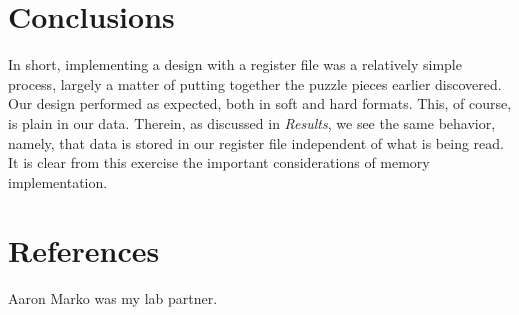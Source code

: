 \documentclass[titlepage]{article}
\begin{document}
    \section{Conclusions}
        
        In short, implementing a design with a register file was a relatively simple process, largely a matter of putting together the puzzle pieces earlier discovered.
        Our design performed as expected, both in soft and hard formats.
        This, of course, is plain in our data.
        Therein, as discussed in \textit{Results}, we see the same behavior, namely, that data is stored in our register file independent of what is being read.
        It is clear from this exercise the important considerations of memory implementation.
        
    \section{References}
        Aaron Marko was my lab partner.
        
%    
\end{document}
